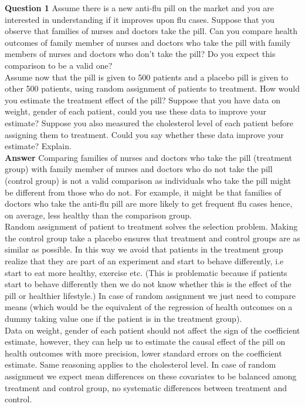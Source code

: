 \documentclass[12pt, oneside]{article}   	%
\begin{document}
\indent \textbf{Question 1 } Assume there is a new anti-flu pill on the market and you are interested in understanding if it improves upon flu cases. Suppose that you observe that families of nurses and doctors take the pill. Can you compare health outcomes of family member of nurses and doctors who take the pill with family members of nurses and doctors who don't take the pill? Do you expect this comparison to be a valid one?\\

Assume now that the pill is given to 500 patients and a placebo pill is given to other 500 patients, using random assignment of patients to treatment. How would you estimate the treatment effect of the pill? Suppose that you have data on weight, gender of each patient, could you use these data to improve your estimate? Suppose you also measured the cholesterol level of each patient before assigning them to treatment. Could you say whether these data improve your estimate? Explain.\\


 \textbf{Answer}  Comparing families of nurses and doctors who take the pill  (treatment group) with family member of nurses and doctors who do not take the pill (control group) is not a valid comparison as individuals who take the pill might be different from those who do not. For example, it might be that families of doctors who take the anti-flu pill are more likely to get frequent flu cases hence, on average, less healthy than the comparison group.\\
 
Random assignment of patient to treatment solves the selection problem. Making the control group take a placebo ensures that treatment and control groups are as similar as possible. In this way we avoid that patients in the treatment group realize that they are part of an experiment and start to behave differently, i.e start to eat more healthy, exercise etc. (This is problematic because if patients start to behave differently then we do not know whether this is the effect of the pill or healthier lifestyle.) In case of random assignment we just need to compare means (which would be the equivalent of the regression of health outcomes on a dummy taking value one if the patient is in the treatment group).  \\

Data on weight, gender of each patient should not affect the sign of the coefficient estimate, however, they can help us to estimate the causal effect of the pill on health outcomes with more precision, lower standard errors on the coefficient estimate. Same reasoning applies to the cholesterol level. In case of random assignment we expect mean differences on these covariates to be balanced among treatment and control group, no systematic differences between treatment and control.
\end{document}
